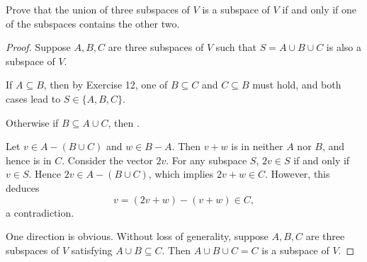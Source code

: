 \begin{exercise}{13}
	Prove that the union of three subspaces of \( V \) is a subspace of \( V \) if and only if one of the subspaces contains the other two.

\end{exercise}

\begin{proof}
	Suppose \( A, B, C \) are three subspaces of \( V \) such that \( S = A \cup B \cup C \) is also a subspace of \( V \).

	If \( A \subseteq B \), then by Exercise 12, one of \( B \subseteq C \) and \( C \subseteq B \) must hold, and both cases lead to \( S \in \{A, B, C\} \).

	Otherwise if \( B \subseteq A \cup C \), then .
	
	Let \( v \in A - (B \cup C) \) and \( w \in B - A \). Then \( v + w \) is in neither \( A \) nor \( B \), and hence is in \( C \). Consider the vector \( 2v \). For any subspace \( S \), \( 2v \in S \) if and only if \( v \in S \). Hence \( 2v \in A - (B \cup C) \), which implies \( 2v + w \in C \). However, this deduces
	\[
		v = (2v + w) - (v + w) \in C,
	\]
	a contradiction.

	One direction is obvious. Without loss of generality, suppose \( A, B, C \) are three subspaces of \( V \) satisfying \( A \cup B \subseteq C \). Then \( A \cup B \cup C = C \) is a subspace of \( V \).
\end{proof}

